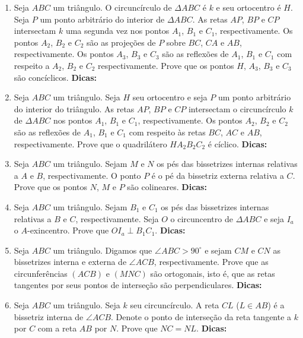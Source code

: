 \documentclass{article}
\newcommand{\dica}{\textbf{Dicas:}}
\newcommand{\iniTri}{Seja $ABC$ um triângulo}
\begin{document}
\begin{multicols}{2}
\begin{enumerate}
    \item \iniTri. O circuncírculo de $\Delta ABC$ é $k$ e seu ortocentro é $H$. Seja $P$ um ponto arbitrário do interior de $\Delta ABC$. As retas $AP$, $BP$ e $CP$ intersectam $k$ uma segunda vez nos pontos $A_1$, $B_1$ e $C_1$, respectivamente. Os pontos $A_2$, $B_2$ e $C_2$ são as projeções de $P$ sobre $BC$, $CA$ e $AB$, respectivamente. Os pontos $A_3$, $B_3$ e $C_3$ são as reflexões de $A_1$, $B_1$ e $C_1$ com respeito a $A_2$, $B_2$ e $C_2$ respectivamente. Prove que os pontos $H$, $A_3$, $B_3$ e $C_3$ são concíclicos. \dica %
    
    \item \iniTri. Seja $H$ seu ortocentro e seja $P$ um ponto arbitrário do interior do triângulo. As retas $AP$, $BP$ e $CP$ intersectam o circuncírculo $k$ de $\Delta ABC$ nos pontos $A_1$, $B_1$ e $C_1$, respectivamente. Os pontos $A_2$, $B_2$ e $C_2$ são as reflexões de $A_1$, $B_1$ e $C_1$ com respeito às retas $BC$, $AC$ e $AB$, respectivamente. Prove que o quadrilátero $HA_2B_2C_2$ é cíclico. \dica %
    
    \item \iniTri. Sejam $M$ e $N$ os pés das bissetrizes internas relativas a $A$ e $B$, respectivamente. O ponto $P$ é o pé da bissetriz externa relativa a $C$. Prove que os pontos $N$, $M$ e $P$ são colineares. \dica %
    
    \item \iniTri. Sejam $B_1$ e $C_1$ os pés das bissetrizes internas relativas a $B$ e $C$, respectivamente. Seja $O$ o circuncentro de $\Delta ABC$ e seja $I_a$ o $A$-exincentro. Prove que $OI_a\perp B_1C_1$. \dica %
    
    \item \iniTri. Digamos que $\angle ABC>90^{\circ}$ e sejam $CM$ e $CN$ as bissetrizes interna e externa de $\angle ACB$, respectivamente. Prove que as circunferências $(ACB)$ e $(MNC)$ são ortogonais, isto é, que as retas tangentes por seus pontos de interseção são perpendiculares. \dica %
    
    \item \iniTri. Seja $k$ seu circuncírculo. A reta $CL$ ($L\in AB$) é a bissetriz interna de $\angle ACB$. Denote o ponto de interseção da reta tangente a $k$ por $C$ com a reta $AB$ por $N$. Prove que $NC=NL$. \dica %
    

\end{enumerate}
\end{multicols}
\end{document}
